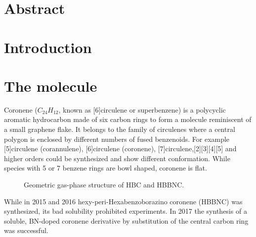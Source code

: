 \label{section:HBBNC}
\label{section:HBC}
\section{Abstract}
\section{Introduction}
\section{The molecule}
Coronene ($C_{24}H_{12}$, known as [6]circulene or superbenzene) is a polycyclic aromatic hydrocarbon made of six carbon rings to form a molecule reminiscent of a small graphene flake. It belongs to the family of circulenes where a central polygon is enclosed by different numbers of fused benzenoids. For example [5]circulene (corannulene), [6]circulene (coronene), [7]circulene,[2][3][4][5] and higher orders could be synthesized and show different conformation. While species with 5 or 7 benzene rings are bowl shaped, coronene is flat.

\begin{figure}[h!]\centering
	 \quad
	\caption{Geometric gas-phase structure of  HBC and  HBBNC.}
	\label{fig:HBBNC+HBC}
\end{figure}

While in 2015 \cite{Krieg_construction_2015} and 2016 \cite{Ciccullo_Quasi-Free-Standing_2016} hexy-peri-Hexabenzoborazino coronene (HBBNC) was synthesized, its bad solubility prohibited experiments. In 2017 the synthesis \cite{dosso_synthesis_2017} of a soluble, BN-doped coronene derivative by substitution of the central carbon ring was successful. 

